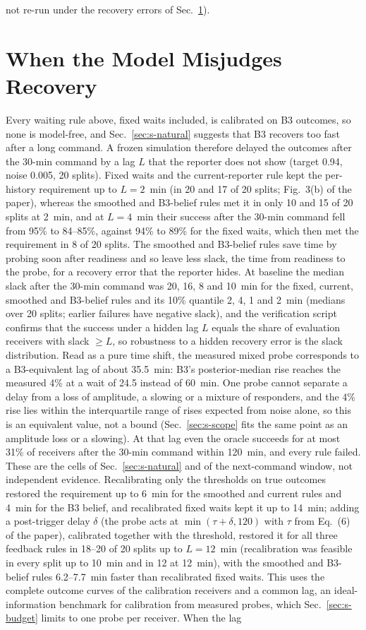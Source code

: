 \documentclass[conference]{IEEEtran}
\begin{document}
not re-run under the recovery errors of Sec.~\ref{sec:s-mismatch}).

\section{When the Model Misjudges Recovery}
\label{sec:s-mismatch}
Every waiting rule above, fixed waits included, is calibrated on B3 outcomes, so none is model-free, and Sec.~\ref{sec:s-natural} suggests that B3 recovers too fast after a long command. A frozen simulation therefore delayed the outcomes after the 30-min command by a lag $L$ that the reporter does not show (target 0.94, noise 0.005, 20 splits). Fixed waits and the current-reporter rule kept the per-history requirement up to $L=2$~min (in 20 and 17 of 20 splits; Fig.~3(b) of the paper), whereas the smoothed and B3-belief rules met it in only 10 and 15 of 20 splits at 2~min, and at $L=4$~min their success after the 30-min command fell from 95\% to 84--85\%, against 94\% to 89\% for the fixed waits, which then met the requirement in 8 of 20 splits. The smoothed and B3-belief rules save time by probing soon after readiness and so leave less slack, the time from readiness to the probe, for a recovery error that the reporter hides. At baseline the median slack after the 30-min command was 20, 16, 8 and 10~min for the fixed, current, smoothed and B3-belief rules and its 10\% quantile 2, 4, 1 and 2~min (medians over 20 splits; earlier failures have negative slack), and the verification script confirms that the success under a hidden lag $L$ equals the share of evaluation receivers with slack $\geq L$, so robustness to a hidden recovery error is the slack distribution. Read as a pure time shift, the measured mixed probe corresponds to a B3-equivalent lag of about 35.5~min: B3's posterior-median rise reaches the measured 4\% at a wait of 24.5 instead of 60~min. One probe cannot separate a delay from a loss of amplitude, a slowing or a mixture of responders, and the 4\% rise lies within the interquartile range of rises expected from noise alone, so this is an equivalent value, not a bound (Sec.~\ref{sec:s-scope} fits the same point as an amplitude loss or a slowing). At that lag even the oracle succeeds for at most 31\% of receivers after the 30-min command within 120~min, and every rule failed. These are the cells of Sec.~\ref{sec:s-natural} and of the next-command window, not independent evidence. Recalibrating only the thresholds on true outcomes restored the requirement up to 6~min for the smoothed and current rules and 4~min for the B3 belief, and recalibrated fixed waits kept it up to 14~min; adding a post-trigger delay $\delta$ (the probe acts at $\min(\tau+\delta,120)$ with $\tau$ from Eq.~(6) of the paper), calibrated together with the threshold, restored it for all three feedback rules in 18--20 of 20 splits up to $L=12$~min (recalibration was feasible in every split up to 10~min and in 12 at 12~min), with the smoothed and B3-belief rules 6.2--7.7~min faster than recalibrated fixed waits. This uses the complete outcome curves of the calibration receivers and a common lag, an ideal-information benchmark for calibration from measured probes, which Sec.~\ref{sec:s-budget} limits to one probe per receiver. When the lag 
\end{document}
